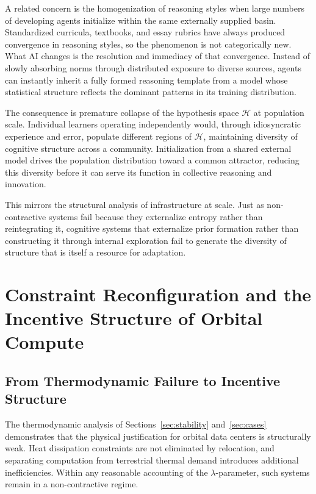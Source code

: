 \documentclass[11pt,a4paper]{article}
\theoremstyle{plain}
\theoremstyle{definition}
\theoremstyle{remark}
\begin{document}
A related concern is the homogenization of reasoning styles when large numbers
of developing agents initialize within the same externally supplied basin.
Standardized curricula, textbooks, and essay rubrics have always produced
convergence in reasoning styles, so the phenomenon is not categorically new.
What AI changes is the resolution and immediacy of that convergence. Instead of
slowly absorbing norms through distributed exposure to diverse sources, agents
can instantly inherit a fully formed reasoning template from a model whose
statistical structure reflects the dominant patterns in its training distribution.

The consequence is premature collapse of the hypothesis space $\mathcal{H}$ at
population scale. Individual learners operating independently would, through
idiosyncratic experience and error, populate different regions of $\mathcal{H}$,
maintaining diversity of cognitive structure across a community. Initialization
from a shared external model drives the population distribution toward a common
attractor, reducing this diversity before it can serve its function in collective
reasoning and innovation.

This mirrors the structural analysis of infrastructure at scale. Just as
non-contractive systems fail because they externalize entropy rather than
reintegrating it, cognitive systems that externalize prior formation rather than
constructing it through internal exploration fail to generate the diversity of
structure that is itself a resource for adaptation.

\section{Constraint Reconfiguration and the Incentive Structure of Orbital Compute}
\label{sec:incentive}

\subsection{From Thermodynamic Failure to Incentive Structure}

The thermodynamic analysis of Sections~\ref{sec:stability} and~\ref{sec:cases}
demonstrates that the physical justification for orbital data centers is
structurally weak. Heat dissipation constraints are not eliminated by
relocation, and separating computation from terrestrial thermal demand introduces
additional inefficiencies. Within any reasonable accounting of the
$\lambda$-parameter, such systems remain in a non-contractive regime.
\end{document}

